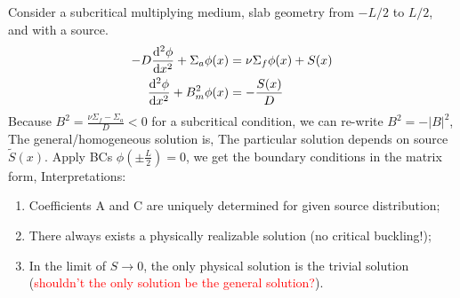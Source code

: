\documentclass{school-22.211-notes}
\begin{document}
\clearpage
{} \label{one-group-source-problem-subcritical}
Consider a subcritical multiplying medium, slab geometry from $-L/2$ to $L/2$, and with a source. 
\begin{align}
  - D \frac{\mathrm{d}^{2}\phi}{\mathrm{d}x^{2}} + \Sigma_a \phi(x) &= \nu \Sigma_f \phi(x) + S(x) \\
  \frac{\mathrm{d}^{2}\phi}{\mathrm{d}x^{2}} + B_m^2 \phi(x) &= -\frac{S(x)}{D} 
\end{align}
Because $B^2 = \frac{\nu \Sigma_f - \Sigma_a}{D} < 0 $ for a subcritical condition, we can re-write $B^2 = - |B|^2$,
The general/homogeneous solution is,
The particular solution depends on source $\tilde{S}(x)$. Apply BCs $\phi \left( \pm \frac{L}{2} \right) = 0$, we get the boundary conditions in the matrix form,
Interpretations:
\begin{enumerate}
\item Coefficients A and C are uniquely determined for given source distribution; 
\item There always exists a physically realizable solution (no critical buckling!);
\item In the limit of $S\to 0$, the only physical solution is the trivial solution (\textcolor{red}{shouldn't the only solution be the general solution?}). 
\end{enumerate}
\end{document}
